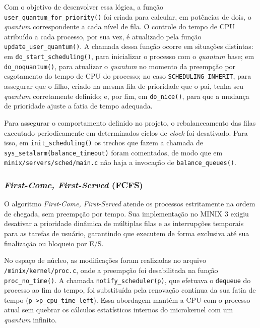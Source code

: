 \documentclass[12pt]{article}
\begin{document}
Com o objetivo de desenvolver essa lógica, a função \texttt{user\_quantum\_for\_priority()} foi criada para calcular, em potências de dois, o \textit{quantum} correspondente a cada nível de fila. O controle do tempo de CPU atribuído a cada processo, por sua vez, é atualizado pela função \texttt{update\_user\_quantum()}. A chamada dessa função ocorre em situações distintas: em \texttt{do\_start\_scheduling()}, para inicializar o processo com o \textit{quantum} base; em \texttt{do\_noquantum()}, para atualizar o \textit{quantum} no momento da preempção por esgotamento do tempo de CPU do processo; no caso \texttt{SCHEDULING\_INHERIT}, para assegurar que o filho, criado na mesma fila de prioridade que o pai, tenha seu \textit{quantum} corretamente definido; e, por fim, em \texttt{do\_nice()}, para que a mudança de prioridade ajuste a fatia de tempo adequada.

Para assegurar o comportamento definido no projeto, o rebalanceamento das filas executado periodicamente em determinados ciclos de \textit{clock} foi desativado. Para isso, em \texttt{init\_scheduling()} os trechos que fazem a chamada de \texttt{sys\_setalarm(balance\_timeout)} foram comentados, de modo que em \texttt{minix/servers/sched/main.c} não haja a invocação de \texttt{balance\_queues()}.
\vspace{-10pt}
\subsubsection{\textit{First-Come, First-Served} (FCFS)}
\vspace{-10pt}
O algoritmo \textit{First-Come, First-Served} atende os processos estritamente na ordem de chegada, sem preempção por tempo. Sua implementação no MINIX 3 exigiu desativar a prioridade dinâmica de múltiplas filas e as interrupções temporais para as tarefas de usuário, garantindo que executem de forma exclusiva até sua finalização ou bloqueio por E/S.

No espaço de núcleo, as modificações foram realizadas no arquivo \texttt{/minix/kernel/proc.c}, onde a preempção foi desabilitada na função \texttt{proc\_no\_time()}. A chamada \texttt{notify\_scheduler(p)}, que efetuava o \texttt{dequeue} do processo ao fim do tempo, foi substituída pela renovação contínua da sua fatia de tempo (\texttt{p->p\_cpu\_time\_left}). Essa abordagem mantém a CPU com o processo atual sem quebrar os cálculos estatísticos internos do microkernel com um \textit{quantum} infinito.
\end{document}
